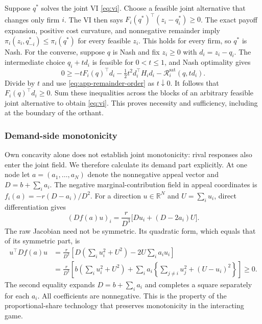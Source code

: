 Suppose $q^*$ solves the joint VI \eqref{eq:vi}.
Choose a feasible joint alternative that changes only firm $i$.
The VI then says $F_i(q^*)^\top(z_i-q_i^*)\geq0$.
The exact payoff expansion, positive cost curvature, and nonnegative
remainder imply
$\pi_i(z_i,q_{-i}^*)\leq\pi_i(q^*)$ for every feasible $z_i$.
This holds for every firm, so $q^*$ is Nash.
For the converse, suppose $q$ is Nash and fix $z_i\geq0$ with $d_i=z_i-q_i$.
The intermediate choice $q_i+td_i$ is feasible for $0<t\leq1$, and
Nash optimality gives
\begin{equation}\label{eq:app-nash-direction}
  0\geq-tF_i(q)^\top d_i-\tfrac12t^2d_i^\top H_i d_i-\mathcal
  R_i^{\mathrm{sat}}(q,td_i).
\end{equation}
Divide by $t$ and use \eqref{eq:app-remainder-order} as $t\downarrow0$.
It follows that $F_i(q)^\top d_i\geq0$.
Sum these inequalities across the blocks of an arbitrary feasible
joint alternative
to obtain \eqref{eq:vi}.
This proves necessity and sufficiency, including at the boundary of the orthant.

\subsubsection{Demand-side monotonicity}

Own concavity alone does not establish joint monotonicity: rival
responses also enter the joint field.
We therefore calculate its demand part explicitly.
At one node let $a=(a_1,\ldots,a_N)$ denote the nonnegative appeal vector and
$D=b+\sum_i a_i$.
The negative marginal-contribution field in appeal coordinates is
$f_i(a)=-r(D-a_i)/D^2$.
For a direction $u\in\mathbb R^N$ and $U=\sum_i u_i$, direct
differentiation gives
\begin{equation}\label{eq:app-node-derivative}
  (Df(a)u)_i=\frac r{D^3}\bigl[D u_i+(D-2a_i)U\bigr].
\end{equation}
The raw Jacobian need not be symmetric.
Its quadratic form, which equals that of its symmetric part, is
\begin{align}
  u^\top Df(a)u
  &=\frac r{D^3}\left[D\left(\sum_i u_i^2+U^2\right)-2U\sum_i a_i
  u_i\right]\label{eq:node-monotonicity}\\
  &=\frac r{D^3}\left[
    b\left(\sum_i u_i^2+U^2\right)
  +\sum_i a_i\left\{\sum_{j\ne i}u_j^2+(U-u_i)^2\right\}\right]\geq0.
  \label{eq:app-demand-squares}
\end{align}
The second equality expands $D=b+\sum_i a_i$ and completes a square
separately for each $a_i$.
All coefficients are nonnegative.
This is the property of the proportional-share technology that preserves
monotonicity in the interacting game.

